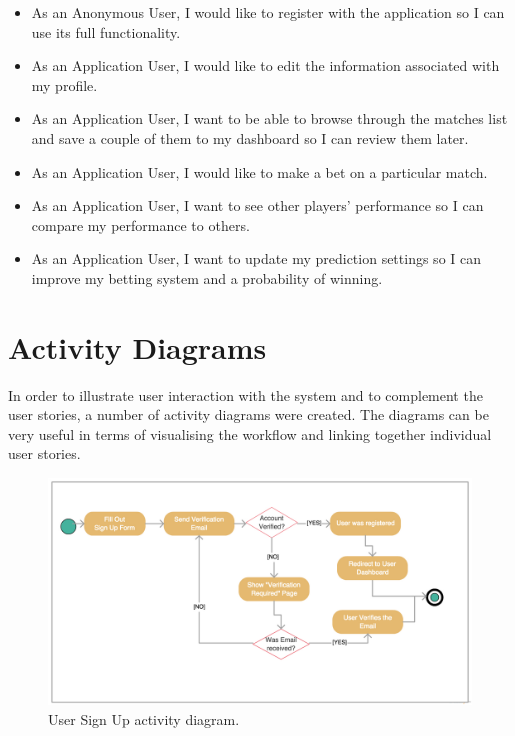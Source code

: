 \begin{itemize}
	\item  As an Anonymous User, I would like to register with the application so I can use its full functionality.
	\item As an Application User, I would like to edit the information associated with my profile.
	\item As an Application User,  I want to be able to browse through the matches list and save a couple of them to my dashboard so I can review them later. 
	\item As an Application User, I would like to make a bet on a particular match.
	\item As an Application User, I want to see other players' performance so I can compare my performance to others. 
	\item As an Application User, I want to update my prediction settings so I can improve my betting system and a probability of winning. 
\end{itemize}

\section{Activity Diagrams}
\label{activitydiagrams_design}
In order to illustrate user interaction with the system and to complement the user stories, a number of activity diagrams were created. The diagrams can be very useful in terms of visualising the workflow and linking together individual user stories.  

\begin{figure}[H]
	\begin{center}
		\includegraphics[width=.90\textwidth]{design/images/ad_1.jpg}
		\caption{User Sign Up activity diagram.} \label{fig:using:activitydiagram1}
	\end{center}
\end{figure}

